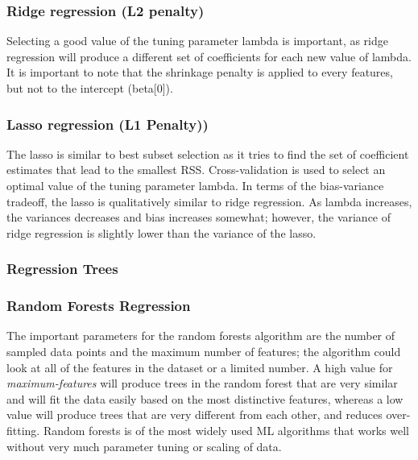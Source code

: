 \documentclass[sigconf]{acmart}
\begin{document}

\subsubsection{Ridge regression (L2 penalty)} 

Selecting a 
good value of the tuning parameter lambda is important, as ridge
regression will produce a different set of coefficients for each new value of 
lambda. It is important to note that the shrinkage penalty is applied to every
features, but not to the intercept (beta[0]). 




\subsubsection{Lasso regression (L1 Penalty))} 
 
The lasso is similar to best subset selection as it tries to find the set of 
coefficient estimates that lead to the smallest RSS. Cross-validation is used to 
select an optimal value of the tuning parameter lambda. In terms of the bias-variance
tradeoff, the lasso is qualitatively similar to ridge regression. As lambda
increases, the variances decreases and bias increases somewhat; however, the
variance of ridge regression is slightly lower than the variance of the lasso.
 

\subsubsection{Regression Trees} 








\subsubsection{Random Forests Regression} 

The important parameters for the random forests 
algorithm are the number of sampled data points and the maximum number of 
features; the algorithm could look at all of the features in the dataset
or a limited number. A high value for \emph{maximum-features} will produce 
trees in the random forest that are very similar and will fit the data 
easily based on the most distinctive features, whereas a low value will 
produce trees that are very different from each other, and reduces over-
fitting. Random forests is of the most widely used ML algorithms that works 
well without very much parameter tuning or scaling of data.
\end{document}

